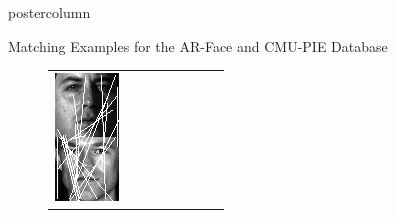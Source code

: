 \documentclass[final,hyperref={pdfpagelabels=false}]{beamer}
\begin{document}
\begin{frame}
\begin{columns}
\begin{column}{.49\textwidth}
\begin{beamercolorbox}[center,wd=\textwidth]{postercolumn}
\begin{minipage}[T]{.95\textwidth}
{\begin{block}{Matching Examples for the AR-Face and CMU-PIE Database}
\begin{figure}
\begin{tabular}{p{.09\linewidth} | p{.12\linewidth} | p{.12\linewidth} | p{.12\linewidth} || p{.12\linewidth} | p{.12\linewidth} | p{.12\linewidth} | p{.09\linewidth} }
                  \includegraphics[width=1.0\linewidth]{paper/bmvc09-surf/figures/matchings/cmupie-surf/maximum_07-27-22.pgm--04-27-08}
                  &

\end{tabular}
\end{figure}
\end{block}}
\end{minipage}
\end{beamercolorbox}
\end{column}
\end{columns}
\end{frame}
\end{document}
